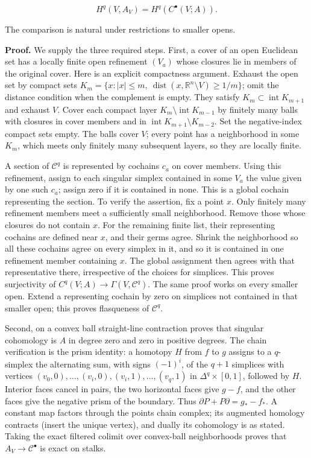 \documentclass[
  english,
  11pt,
  a4paper,
]{article}
\begin{document}
\[H^q(V,A_V)=H^q(C^\bullet(V;A)).
\tag{4.1}\]

The comparison is natural under restrictions to smaller opens.

\textbf{Proof.} We supply the three required steps. First, a cover of an
open Euclidean set has a locally finite open refinement \((V_a)\) whose
closures lie in members of the original cover. Here is an explicit
compactness argument. Exhaust the open set by compact sets
\(K_m=\{x:|x|\leq m,\ \operatorname{dist}(x,\mathbb R^n\setminus V)\geq1/m\}\);
omit the distance condition when the complement is empty. They satisfy
\(K_m\subset\operatorname{int}K_{m+1}\) and exhaust \(V\). Cover each
compact layer \(K_m\setminus\operatorname{int}K_{m-1}\) by finitely many
balls with closures in cover members and in
\(\operatorname{int}K_{m+1}\setminus K_{m-2}\). Set the negative-index
compact sets empty. The balls cover \(V\); every point has a
neighborhood in some \(K_m\), which meets only finitely many subsequent
layers, so they are locally finite.

A section of \(\mathcal C^q\) is represented by cochains \(c_a\) on
cover members. Using this refinement, assign to each singular simplex
contained in some \(V_a\) the value given by one such \(c_a\); assign
zero if it is contained in none. This is a global cochain representing
the section. To verify the assertion, fix a point \(x\). Only finitely
many refinement members meet a sufficiently small neighborhood. Remove
those whose closures do not contain \(x\). For the remaining finite
list, their representing cochains are defined near \(x\), and their
germs agree. Shrink the neighborhood so all these cochains agree on
every simplex in it, and so it is contained in one refinement member
containing \(x\). The global assignment then agrees with that
representative there, irrespective of the choices for simplices. This
proves surjectivity of \(C^q(V;A)\to\Gamma(V,\mathcal C^q)\). The same
proof works on every smaller open. Extend a representing cochain by zero
on simplices not contained in that smaller open; this proves flasqueness
of \(\mathcal C^q\).

Second, on a convex ball straight-line contraction proves that singular
cohomology is \(A\) in degree zero and zero in positive degrees. The
chain verification is the prism identity: a homotopy \(H\) from \(f\) to
\(g\) assigns to a \(q\)-simplex the alternating sum, with signs
\((-1)^i\), of the \(q+1\) simplices with vertices
\((v_0,0),\ldots,(v_i,0),(v_i,1),\ldots,(v_q,1)\) in
\(\Delta^q\times[0,1]\), followed by \(H\). Interior faces cancel in
pairs, the two horizontal faces give \(g-f\), and the other faces give
the negative prism of the boundary. Thus
\(\partial P+P\partial=g_*-f_*\). A constant map factors through the
point\textquotesingle s chain complex; its augmented homology contracts
(insert the unique vertex), and dually its cohomology is as stated.
Taking the exact filtered colimit over convex-ball neighborhoods proves
that \(A_V\to\mathcal C^\bullet\) is exact on stalks.
\end{document}
